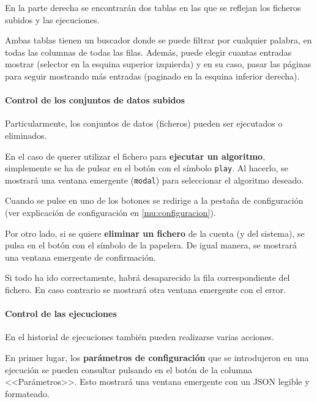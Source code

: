 En la parte derecha se encontrarán dos tablas en las que se reflejan los
ficheros subidos y las ejecuciones.


Ambas tablas tienen un buscador donde se puede filtrar por cualquier palabra, en
todas las columnas de todas las filas. Además, puede elegir cuantas entradas
mostrar (selector en la esquina superior izquierda) y en su caso, pasar las
páginas para seguir mostrando más entradas (paginado en la esquina inferior
derecha).

\paragraph{Control de los conjuntos de datos subidos} Particularmente, los
conjuntos de datos (ficheros) pueden ser ejecutados o eliminados.

En el caso de querer utilizar el fichero para \textbf{ejecutar un algoritmo},
simplemente se ha de pulsar en el botón con el símbolo \texttt{play}. Al
hacerlo, se mostrará una ventana emergente (\texttt{modal}) para seleccionar el
algoritmo deseado.


Cuando se pulse en uno de los botones se redirige a la pestaña de configuración
(ver explicación de configuración en \ref{mu:configuracion}).

\label{mu:eliminardataset}
Por otro lado, si se quiere \textbf{eliminar un fichero} de la cuenta (y del
sistema), se pulsa en el botón con el símbolo de la papelera. De igual manera,
se mostrará una ventana emergente de confirmación.


Si todo ha ido correctamente, habrá desaparecido la fila correspondiente del
fichero. En caso contrario se mostrará otra ventana emergente con el error.

\paragraph{Control de las ejecuciones} En el historial de ejecuciones también
pueden realizarse varias acciones.

\label{mu:parametrosrun}
En primer lugar, los \textbf{parámetros de configuración} que se introdujeron en
una ejecución se pueden consultar pulsando en el botón de la columna
<<Parámetros>>. Esto mostrará una ventana emergente con un JSON legible y
formateado.

